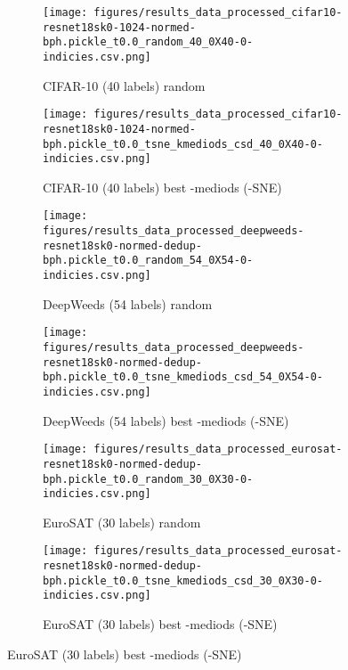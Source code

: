 \documentclass{article}
\begin{document}
\begin{figure}[p]
     \begin{subfigure}[b]{0.5\textwidth}
         \centering
         \texttt{[image: figures/results\_data\_processed\_cifar10-resnet18sk0-1024-normed-bph.pickle\_t0.0\_random\_40\_0X40-0-indicies.csv.png]}
         \caption{CIFAR-10 (40 labels) random}
         \label{fig:example_images_cifar10_random}
     \end{subfigure}
     \hfill
     \begin{subfigure}[b]{0.5\textwidth}
         \centering
         \texttt{[image: figures/results\_data\_processed\_cifar10-resnet18sk0-1024-normed-bph.pickle\_t0.0\_tsne\_kmediods\_csd\_40\_0X40-0-indicies.csv.png]}
         \caption{CIFAR-10 (40 labels) best -mediods (-SNE)}
         \label{fig:example_images_cifar10_kmediods}
     \end{subfigure}
     \begin{subfigure}[b]{0.5\textwidth}
         \centering
         \texttt{[image: figures/results\_data\_processed\_deepweeds-resnet18sk0-normed-dedup-bph.pickle\_t0.0\_random\_54\_0X54-0-indicies.csv.png]}
         \caption{DeepWeeds (54 labels) random}
         \label{fig:example_images_deepweeds_random}
     \end{subfigure}
     \hfill
     \begin{subfigure}[b]{0.5\textwidth}
         \centering
         \texttt{[image: figures/results\_data\_processed\_deepweeds-resnet18sk0-normed-dedup-bph.pickle\_t0.0\_tsne\_kmediods\_csd\_54\_0X54-0-indicies.csv.png]}
         \caption{DeepWeeds (54 labels) best -mediods (-SNE)}
         \label{fig:example_images_deepweeds_kmediods}
     \end{subfigure}
     \begin{subfigure}[b]{0.5\textwidth}
         \centering
         \texttt{[image: figures/results\_data\_processed\_eurosat-resnet18sk0-normed-dedup-bph.pickle\_t0.0\_random\_30\_0X30-0-indicies.csv.png]}
         \caption{EuroSAT (30 labels) random}
         \label{fig:example_images_eurosat_random}
     \end{subfigure}
     \hfill
     \begin{subfigure}[b]{0.5\textwidth}
         \centering
         \texttt{[image: figures/results\_data\_processed\_eurosat-resnet18sk0-normed-dedup-bph.pickle\_t0.0\_tsne\_kmediods\_csd\_30\_0X30-0-indicies.csv.png]}
         \caption{EuroSAT (30 labels) best -mediods (-SNE)}
         \label{fig:example_images_eurosat_kmediods}

\end{subfigure}
\end{figure}
\end{document}
